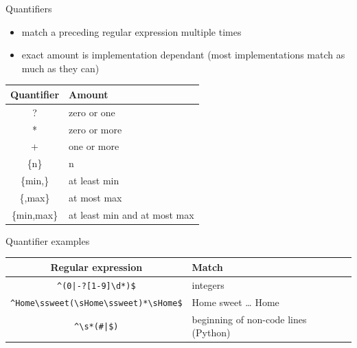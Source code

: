 \documentclass[10pt, graphics, aspectratio=169, table]{beamer}
\begin{document}
    \begin{frame}{Quantifiers}
        \begin{itemize}
            \item match a preceding regular expression multiple times
            \item exact amount is implementation dependant (most implementations match as much as they can)
        \end{itemize}
        \begin{center}
            \begin{tabular}{cl}
                \toprule
                Quantifier & Amount \\
                \midrule
                ? & zero or one \\
                * & zero or more \\
                + & one or more \\
                \{n\} & n \\
                \{min,\} & at least min \\
                \{,max\} & at most max \\
                \{min,max\} & at least min and at most max \\
                \bottomrule
            \end{tabular}
        \end{center}
    \end{frame}

    \begin{frame}[fragile]{Quantifier examples}
        \begin{center}
            \begin{tabular}{cl}
                \toprule
                Regular expression & Match \\
                \midrule
                \verb!^(0|-?[1-9]\d*)$!  & integers \\
                \verb!^Home\ssweet(\sHome\ssweet)*\sHome$! & Home sweet \ldots{} Home \\
                \verb!^\s*(#|$)! & beginning of non-code lines (Python) \\
                \bottomrule
            \end{tabular}
        \end{center}
    \end{frame}
\end{document}
